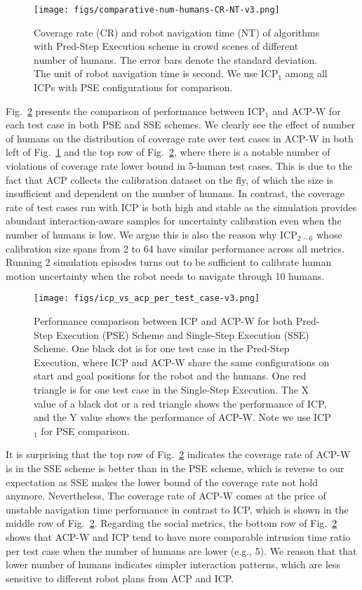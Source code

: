 \begin{figure}[hbt!]
\texttt{[image: figs/comparative-num-humans-CR-NT-v3.png]}
\caption{Coverage rate (CR) and robot navigation time (NT) of algorithms with Pred-Step Execution scheme in crowd scenes of different number of humans. The error bars denote the standard deviation. The unit of robot navigation time is second. We use ICP$_1$ among all ICPs with PSE configurations for comparison.} \label{fig-cr-nt-mean-std}
\end{figure}

Fig.~\ref{fig-test-case} presents the comparison of performance between ICP$_1$ and ACP-W for each test case in both PSE and SSE schemes. We clearly see the effect of number of humans on the distribution of coverage rate over test cases in ACP-W in both left of Fig.~\ref{fig-cr-nt-mean-std} and the top row of Fig.~\ref{fig-test-case}, where there is a notable number of violations of coverage rate lower bound in 5-human test cases. This is due to the fact that ACP collects the calibration dataset on the fly, of which the size is insufficient and dependent on the number of humans. In contrast, the coverage rate of test cases run with ICP is both high and stable as the simulation provides abundant interaction-aware samples for uncertainty calibration even when the number of humans is low. We argue this is also the reason why ICP$_{2-6}$ whose calibration size spans from 2 to 64 have similar performance across all metrics. Running 2 simulation episodes turns out to be sufficient to calibrate human motion uncertainty when the robot needs to navigate through 10 humans.

\begin{figure}[hbt!]
\texttt{[image: figs/icp\_vs\_acp\_per\_test\_case-v3.png]}
\caption{Performance comparison between ICP and ACP-W for both Pred-Step Execution (PSE) Scheme and Single-Step Execution (SSE) Scheme. One black dot is for one test case in the Pred-Step Execution, where ICP and ACP-W share the same configurations on start and goal positions for the robot and the humans. One red triangle is for one test case in the Single-Step Execution. The X value of a black dot or a red triangle shows the performance of ICP, and the Y value shows the performance of ACP-W. Note we use ICP$_1$ for PSE comparison.} \label{fig-test-case}
\end{figure}

It is surprising that the top row of Fig.~\ref{fig-test-case} indicates the coverage rate of ACP-W is in the SSE scheme is better than in the PSE scheme, which is reverse to our expectation as SSE makes the lower bound of the coverage rate not hold anymore. Nevertheless, The coverage rate of ACP-W comes at the price of unstable navigation time performance in contrast to ICP, which is shown in the middle row of Fig.~\ref{fig-test-case}. Regarding the social metrics, the bottom row of Fig.~\ref{fig-test-case} shows that ACP-W and ICP tend to have more comparable intrusion time ratio per test case when the number of humans are lower (e.g., 5). We reason that that lower number of humans indicates simpler interaction patterns, which are less sensitive to different robot plans from ACP and ICP.

